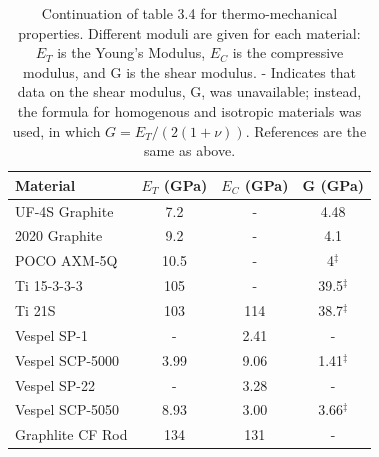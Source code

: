 \documentclass{report}
\begin{document}
\begin{table}[htb]
\begin{threeparttable}
\begin{tabular}{lccc}
\toprule
\textbf{Material} & $E_{T}$ (GPa) & $E_{C}$ (GPa) & G (GPa) \\
\midrule
 UF-4S Graphite & 7.2 & - & 4.48 \\
 2020 Graphite & 9.2 & - & 4.1 \\
 POCO AXM-5Q & 10.5 & - & 4$^{\ddag}$ \\
 Ti 15-3-3-3 & 105 & - & 39.5$^{\ddag}$ \\
 Ti 21S & 103 & 114 & 38.7$^{\ddag}$ \\
 Vespel SP-1 & - & 2.41 & - \\
 Vespel SCP-5000 & 3.99 & 9.06 & 1.41$^{\ddag}$\\
 Vespel SP-22 & - & 3.28 & - \\
 Vespel SCP-5050 & 8.93 & 3.00 & 3.66$^{\ddag}$\\
 Graphlite CF Rod & 134 & 131 & - \\
 \bottomrule
\end{tabular}
\caption{Continuation of table 3.4 for thermo-mechanical properties. Different moduli are given for each material: $E_{T}$ is the Young's Modulus, $E_{C}$ is the compressive modulus, and G is the shear modulus. \ddag - Indicates that data on the shear modulus, G, was unavailable; instead, the formula for homogenous and isotropic materials was used, in which $G = E_{T}/(2(1 + \nu))$. References are the same as above. }
\end{threeparttable}
\end{table}
\end{document}
